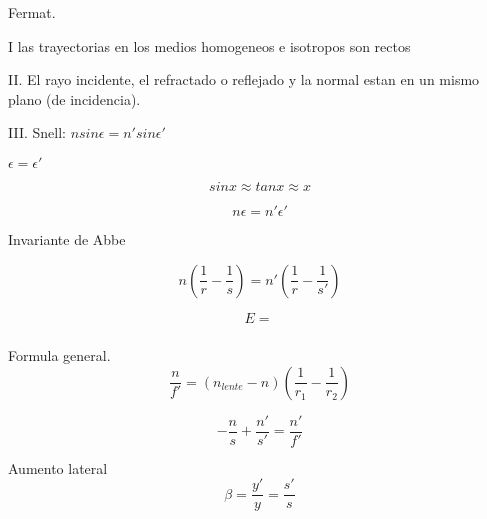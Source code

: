 \documentclass[12pt, letterpaper, twoside]{article}
\begin{document}
	Fermat.
	
	I las trayectorias en los medios homogeneos e isotropos son rectos
	
	II. El rayo incidente, el refractado o reflejado y la normal estan en un mismo plano (de incidencia).
	
	III. Snell: $n sin \epsilon = n' sin \epsilon'$
	
	$\epsilon = \epsilon'$
	
	\begin{equation}
		sin x \approx tan x \approx x 
	\end{equation}

	\begin{equation}
		n \epsilon = n' \epsilon'
	\end{equation}

	Invariante de Abbe
	
	\begin{equation}
		n ( \frac{1}{r} - \frac{1}{s} ) = n' (\frac{1}{r} - \frac{1}{s'} )
	\end{equation}

	\begin{equation}
		E = \frac{}{}
	\end{equation}

	Formula general.	
	\begin{equation}
		\frac{n}{f'} = (n_{lente} - n)(\frac{1}{r_1} - \frac{1}{r_2})
	\end{equation}

	\begin{equation}
		-\frac{n}{s} + \frac{n'}{s'} = \frac{n'}{f'}
	\end{equation}
	
	Aumento lateral
	\begin{equation}
		\beta = \frac{y'}{y} = \frac{s'}{s}
	\end{equation}
	
	
\end{document}
